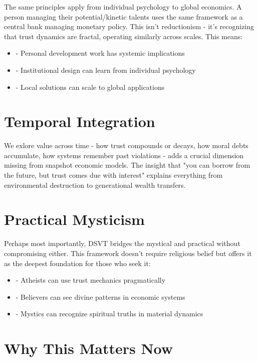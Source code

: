 \documentclass[11pt,oneside]{book}
\begin{document}
The same principles apply from individual psychology to global economics. A person managing their potential/kinetic talents uses the same framework as a central bank managing monetary policy. This isn't reductionism - it's recognizing that trust dynamics are fractal, operating similarly across scales. This means:

\begin{itemize}
\item - Personal development work has systemic implications
\item - Institutional design can learn from individual psychology
\item - Local solutions can scale to global applications
\end{itemize}

\section{Temporal Integration}

We exlore value across time - how trust compounds or decays, how moral debts accumulate, how systems remember past violations - adds a crucial dimension missing from snapshot economic models. The insight that "you can borrow from the future, but trust comes due with interest" explains everything from environmental destruction to generational wealth transfers.

\section{Practical Mysticism}

Perhaps most importantly, DSVT bridges the mystical and practical without compromising either. This framework doesn't require religious belief but offers it as the deepest foundation for those who seek it:

\begin{itemize}
\item - Atheists can use trust mechanics pragmatically
\item - Believers can see divine patterns in economic systems
\item - Mystics can recognize spiritual truths in material dynamics
\end{itemize}

\section{Why This Matters Now}
\end{document}

